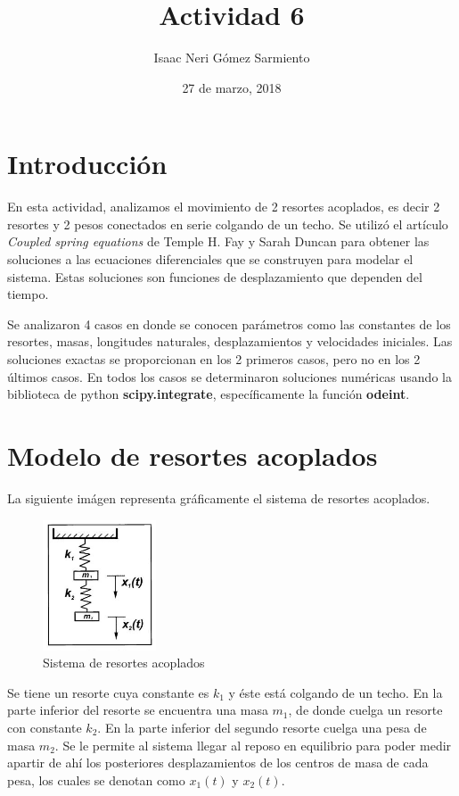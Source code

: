 \documentclass[a4paper]{article}
\title{Actividad 6}
\author{Isaac Neri Gómez Sarmiento}
\date{27 de marzo, 2018}
\begin{document}
\maketitle


\section{Introducción}
En esta actividad, analizamos el movimiento de 2 resortes acoplados, es decir 2 resortes y 2 pesos conectados en serie colgando de un techo. Se utilizó el artículo \textit{Coupled spring equations} de Temple H. Fay y Sarah Duncan para obtener las soluciones a las ecuaciones diferenciales que se construyen para modelar el sistema. Estas soluciones son funciones de desplazamiento que dependen del tiempo. 

Se analizaron 4 casos en donde se conocen parámetros como las constantes de los resortes, masas, longitudes naturales, desplazamientos y velocidades iniciales. Las soluciones exactas se proporcionan en los 2 primeros casos, pero no en los 2 últimos casos. En todos los casos se determinaron soluciones numéricas usando la biblioteca de python \textbf{scipy.integrate}, específicamente la función \textbf{odeint}.

\section{Modelo de resortes acoplados}
La siguiente imágen representa gráficamente el sistema de resortes acoplados.

\begin{figure}[ht!]
\centering
\includegraphics[width=0.3\textwidth]{Resortes_acoplados.JPG}
\caption{\label{fig:Sistema de resortes acoplados}Sistema de resortes acoplados}
\end{figure}

Se tiene un resorte cuya constante es $k_1$ y éste está colgando de un techo. En la parte inferior del resorte se encuentra una masa $m_1$, de donde cuelga un resorte con constante $k_2$. En la parte inferior del segundo resorte cuelga una pesa de masa $m_2$. Se le permite al sistema llegar al reposo en equilibrio para poder medir apartir de ahí los posteriores desplazamientos de los centros de masa de cada pesa, los cuales se denotan como $x_1(t)$ y $x_2(t)$.
\end{document}
